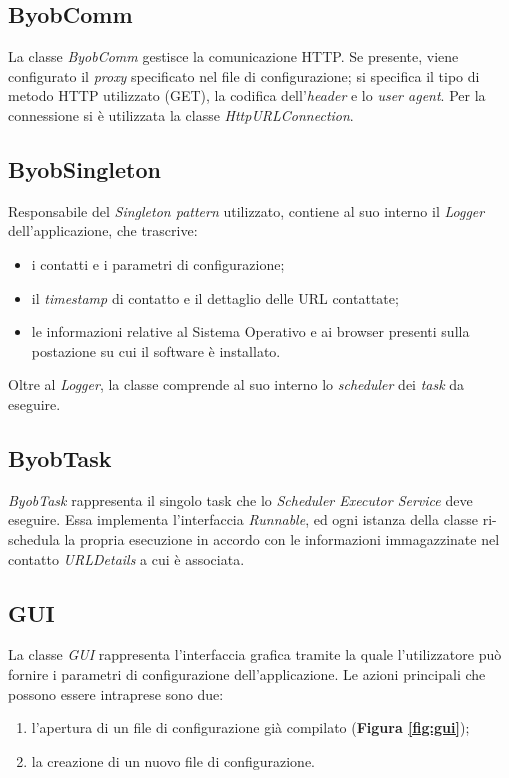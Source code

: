 \vspace*{0.5cm}
\subsection{ByobComm}
La classe \textit{ByobComm} gestisce la comunicazione HTTP.
Se presente, viene configurato il \textit{proxy} specificato nel file di configurazione; si specifica il tipo di metodo HTTP utilizzato (GET), la codifica dell'\textit{header} e lo \textit{user agent}.
Per la connessione si \`{e} utilizzata la classe \textit{HttpURLConnection}.

\vspace*{0.5cm}
\subsection{ByobSingleton}
Responsabile del \textit{Singleton pattern} utilizzato, contiene al suo interno il \textit{Logger} dell'applicazione, che trascrive:

\begin{itemize}
\item i contatti e i parametri di configurazione;
\item il \textit{timestamp} di contatto e il dettaglio delle URL contattate;
\item le informazioni relative al Sistema Operativo e ai browser presenti sulla postazione su cui il software \`e installato.
\end{itemize}
Oltre al \textit{Logger}, la classe comprende al suo interno lo \textit{scheduler} dei \textit{task} da eseguire.

\vspace*{0.5cm}
\subsection{ByobTask}
\textit{ByobTask} rappresenta il singolo task che lo \textit{Scheduler Executor Service} deve eseguire.
Essa implementa l'interfaccia \textit{Runnable}, ed ogni istanza della classe ri-schedula la propria esecuzione in accordo con le informazioni immagazzinate nel contatto \textit{URLDetails} a cui \`{e} associata.

\vspace*{0.5cm}
\subsection{GUI}

La classe \textit{GUI} rappresenta l'interfaccia grafica tramite la quale l'utilizzatore pu\`{o} fornire i parametri di configurazione dell'applicazione.
Le azioni principali che possono essere intraprese sono due:
\begin{enumerate}
\item l'apertura di un file di configurazione gi\`{a} compilato (\textbf{Figura \ref{fig:gui}});
\item la creazione di un nuovo file di configurazione.
\end{enumerate}

